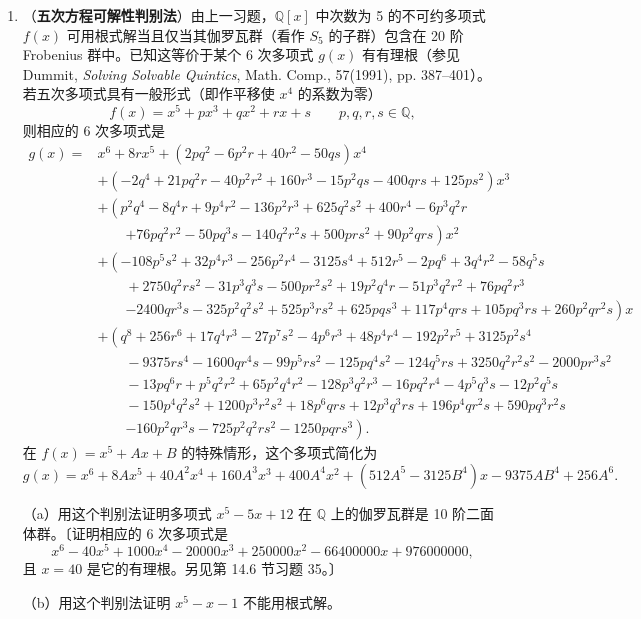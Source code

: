 \begin{enumerate}
\item （\textbf{五次方程可解性判别法}）由上一习题，\(\mathbb{Q}[x]\) 中次数为 5 的不可约多项式 \(f(x)\) 可用根式解当且仅当其伽罗瓦群（看作 \(S_5\) 的子群）包含在 20 阶 Frobenius 群中。已知这等价于某个 6 次多项式 \(g(x)\) 有有理根（参见 Dummit, \textit{Solving Solvable Quintics}, Math. Comp., 57(1991), pp. 387--401）。若五次多项式具有一般形式（即作平移使 \(x^4\) 的系数为零）
\[
f(x) = x^5+px^3+qx^2+rx+s \qquad p, q, r, s \in \mathbb{Q},
\]
则相应的 6 次多项式是
\[
\begin{aligned}
g(x) = {}& x^6+8rx^5+\left(2pq^2-6p^2r+40r^2-50qs\right)x^4\\
&+\left(-2q^4+21pq^2r-40p^2r^2+160r^3-15p^2qs-400qrs+125ps^2\right)x^3\\
&+\left(p^2q^4-8q^4r+9p^4r^2-136p^2r^3+625q^2s^2+400r^4-6p^3q^2r\right.\\
&\qquad\left.+76pq^2r^2-50pq^3s-140q^2r^2s+500prs^2+90p^2qrs\right)x^2\\
&+\left(-108p^5s^2+32p^4r^3-256p^2r^4-3125s^4+512r^5-2pq^6+3q^4r^2-58q^5s\right.\\
&\qquad+2750q^2rs^2-31p^3q^3s-500pr^2s^2+19p^2q^4r-51p^3q^2r^2+76pq^2r^3\\
&\qquad\left.-2400qr^3s-325p^2q^2s^2+525p^3rs^2+625pqs^3+117p^4qrs+105pq^3rs+260p^2qr^2s\right)x\\
&+\left(q^8+256r^6+17q^4r^3-27p^7s^2-4p^6r^3+48p^4r^4-192p^2r^5+3125p^2s^4\right.\\
&\qquad-9375rs^4-1600qr^4s-99p^5rs^2-125pq^4s^2-124q^5rs+3250q^2r^2s^2-2000pr^3s^2\\
&\qquad-13pq^6r+p^5q^2r^2+65p^2q^4r^2-128p^3q^2r^3-16pq^2r^4-4p^5q^3s-12p^2q^5s\\
&\qquad-150p^4q^2s^2+1200p^3r^2s^2+18p^6qrs+12p^3q^3rs+196p^4qr^2s+590pq^3r^2s\\
&\qquad\left.-160p^2qr^3s-725p^2q^2rs^2-1250pqrs^3\right).
\end{aligned}
\]
在 \(f(x) = x^5+Ax+B\) 的特殊情形，这个多项式简化为
\[
g(x) = x^6+8Ax^5+40A^2x^4+160A^3x^3+400A^4x^2+\left(512A^5-3125B^4\right)x-9375AB^4+256A^6.
\]

（a）用这个判别法证明多项式 \(x^5-5x+12\) 在 \(\mathbb{Q}\) 上的伽罗瓦群是 10 阶二面体群。〔证明相应的 6 次多项式是
\[
x^6-40x^5+1000x^4-20000x^3+250000x^2-66400000x+976000000,
\]
且 \(x = 40\) 是它的有理根。另见第 14.6 节习题 35。〕

（b）用这个判别法证明 \(x^5-x-1\) 不能用根式解。
\end{enumerate}

